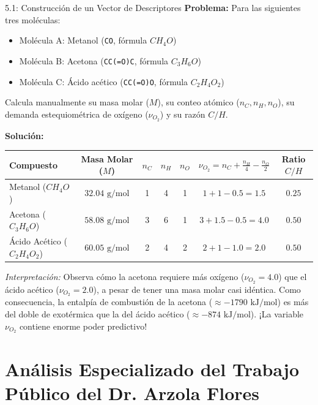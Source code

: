 \documentclass[11pt,letterpaper]{report}
\begin{document}
\begin{exercisebox}{5.1: Construcción de un Vector de Descriptores}
\textbf{Problema:} Para las siguientes tres moléculas:
\begin{itemize}
    \item Molécula A: Metanol (\texttt{CO}, fórmula $CH_4O$)
    \item Molécula B: Acetona (\texttt{CC(=O)C}, fórmula $C_3H_6O$)
    \item Molécula C: Ácido acético (\texttt{CC(=O)O}, fórmula $C_2H_4O_2$)
\end{itemize}
Calcula manualmente su masa molar ($M$), su conteo atómico ($n_C, n_H, n_O$), su demanda estequiométrica de oxígeno ($\nu_{O_2}$) y su razón $C/H$.

\vspace{0.2cm}\noindent\textbf{Solución:}
\begin{center}
\small
\begin{tabular}{l c c c c c c}
\toprule
\textbf{Compuesto} & \textbf{Masa Molar ($M$)} & $n_C$ & $n_H$ & $n_O$ & $\nu_{O_2} = n_C + \frac{n_H}{4} - \frac{n_O}{2}$ & \textbf{Ratio $C/H$} \\
\midrule
Metanol ($CH_4O$) & $32.04\text{ g/mol}$ & 1 & 4 & 1 & $1 + 1 - 0.5 = \mathbf{1.5}$ & $0.25$ \\
Acetona ($C_3H_6O$) & $58.08\text{ g/mol}$ & 3 & 6 & 1 & $3 + 1.5 - 0.5 = \mathbf{4.0}$ & $0.50$ \\
Ácido Acético ($C_2H_4O_2$) & $60.05\text{ g/mol}$ & 2 & 4 & 2 & $2 + 1 - 1.0 = \mathbf{2.0}$ & $0.50$ \\
\bottomrule
\end{tabular}
\end{center}
\textit{Interpretación:} Observa cómo la acetona requiere más oxígeno ($\nu_{O_2} = 4.0$) que el ácido acético ($\nu_{O_2} = 2.0$), a pesar de tener una masa molar casi idéntica. Como consecuencia, la entalpía de combustión de la acetona ($\approx -1790\text{ kJ/mol}$) es más del doble de exotérmica que la del ácido acético ($\approx -874\text{ kJ/mol}$). ¡La variable $\nu_{O_2}$ contiene enorme poder predictivo!
\end{exercisebox}

\newpage

\chapter{Análisis Especializado del Trabajo Público del Dr. Arzola Flores}
\end{document}
